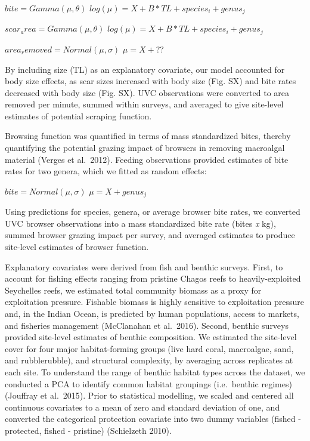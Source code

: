 \documentclass[]{article}
\begin{document}
\(bite = Gamma(\mu, \theta)\)
\(log(\mu) = X + B*TL + species_i + genus_j\)

\(scar_area = Gamma(\mu, \theta)\)
\(log(\mu) = X + B*TL + species_i + genus_j\)

\(area_removed = Normal(\mu, \sigma)\) \(\mu = X + ??\)

By including size (TL) as an explanatory covariate, our model accounted
for body size effects, as scar sizes increased with body size (Fig. SX)
and bite rates decreased with body size (Fig. SX). UVC observations were
converted to area removed per minute, summed within surveys, and
averaged to give site-level estimates of potential scraping function.

Browsing function was quantified in terms of mass standardized bites,
thereby quantifying the potential grazing impact of browsers in removing
macroalgal material (Verges et al.~2012). Feeding observations provided
estimates of bite rates for two genera, which we fitted as random
effects:

\(bite = Normal(\mu, \sigma)\) \(\mu = X + genus_j\)

Using predictions for species, genera, or average browser bite rates, we
converted UVC browser observations into a mass standardized bite rate
(bites \emph{x} kg), summed browser grazing impact per survey, and
averaged estimates to produce site-level estimates of browser function.

Explanatory covariates were derived from fish and benthic surveys.
First, to account for fishing effects ranging from pristine Chagos reefs
to heavily-exploited Seychelles reefs, we estimated total community
biomass as a proxy for exploitation pressure. Fishable biomass is highly
sensitive to exploitation pressure and, in the Indian Ocean, is
predicted by human populations, access to markets, and fisheries
management (McClanahan et al.~2016). Second, benthic surveys provided
site-level estimates of benthic composition. We estimated the site-level
cover for four major habitat-forming groups (live hard coral,
macroalgae, sand, and rubblerubble), and structural complexity, by
averaging across replicates at each site. To understand the range of
benthic habitat types across the dataset, we conducted a PCA to identify
common habitat groupings (i.e.~benthic regimes) (Jouffray et al.~2015).
Prior to statistical modelling, we scaled and centered all continuous
covariates to a mean of zero and standard deviation of one, and
converted the categorical protection covariate into two dummy variables
(fished - protected, fished - pristine) (Schielzeth 2010).
\end{document}
